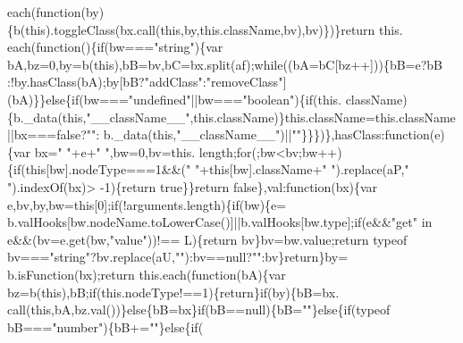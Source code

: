 \begin{DoxyCode}
      each(\textcolor{keyword}{function}(by)\{b(\textcolor{keyword}{this}).toggleClass(bx.call(\textcolor{keyword}{this},by,\textcolor{keyword}{this}.className,bv),bv)\})\}\textcolor{keywordflow}{return} this.
      each(\textcolor{keyword}{function}()\{\textcolor{keywordflow}{if}(bw===\textcolor{stringliteral}{"string"})\{var bA,bz=0,by=b(\textcolor{keyword}{this}),bB=bv,bC=bx.split(af);\textcolor{keywordflow}{while}((bA=bC[bz++]))\{bB=e?bB
      :!by.hasClass(bA);by[bB?\textcolor{stringliteral}{"addClass"}:\textcolor{stringliteral}{"removeClass"}](bA)\}\}\textcolor{keywordflow}{else}\{\textcolor{keywordflow}{if}(bw===\textcolor{stringliteral}{"undefined"}||bw===\textcolor{stringliteral}{"boolean"})\{\textcolor{keywordflow}{if}(this.
      className)\{b.\_data(\textcolor{keyword}{this},\textcolor{stringliteral}{"\_\_className\_\_"},this.className)\}this.className=this.className||bx===\textcolor{keyword}{false}?\textcolor{stringliteral}{""}:
      b.\_data(\textcolor{keyword}{this},\textcolor{stringliteral}{"\_\_className\_\_"})||\textcolor{stringliteral}{""}\}\}\})\},hasClass:\textcolor{keyword}{function}(e)\{var bx=\textcolor{stringliteral}{" "}+e+\textcolor{stringliteral}{" "},bw=0,bv=this.
      length;\textcolor{keywordflow}{for}(;bw<bv;bw++)\{\textcolor{keywordflow}{if}(\textcolor{keyword}{this}[bw].nodeType===1&&(\textcolor{stringliteral}{" "}+\textcolor{keyword}{this}[bw].className+\textcolor{stringliteral}{" "}).replace(aP,\textcolor{stringliteral}{" "}).indexOf(bx)>
      -1)\{\textcolor{keywordflow}{return} \textcolor{keyword}{true}\}\}\textcolor{keywordflow}{return} \textcolor{keyword}{false}\},val:\textcolor{keyword}{function}(bx)\{var e,bv,by,bw=\textcolor{keyword}{this}[0];\textcolor{keywordflow}{if}(!arguments.length)\{\textcolor{keywordflow}{if}(bw)\{e=
      b.valHooks[bw.nodeName.toLowerCase()]||b.valHooks[bw.type];\textcolor{keywordflow}{if}(e&&\textcolor{stringliteral}{"get"} in e&&(bv=e.get(bw,\textcolor{stringliteral}{"value"}))!==
      L)\{\textcolor{keywordflow}{return} bv\}bv=bw.value;\textcolor{keywordflow}{return} typeof bv===\textcolor{stringliteral}{"string"}?bv.replace(aU,\textcolor{stringliteral}{""}):bv==null?\textcolor{stringliteral}{""}:bv\}\textcolor{keywordflow}{return}\}by=
      b.isFunction(bx);\textcolor{keywordflow}{return} this.each(\textcolor{keyword}{function}(bA)\{var bz=b(\textcolor{keyword}{this}),bB;\textcolor{keywordflow}{if}(this.nodeType!==1)\{\textcolor{keywordflow}{return}\}\textcolor{keywordflow}{if}(by)\{bB=bx.
      call(\textcolor{keyword}{this},bA,bz.val())\}\textcolor{keywordflow}{else}\{bB=bx\}\textcolor{keywordflow}{if}(bB==null)\{bB=\textcolor{stringliteral}{""}\}\textcolor{keywordflow}{else}\{\textcolor{keywordflow}{if}(typeof bB===\textcolor{stringliteral}{"number"})\{bB+=\textcolor{stringliteral}{""}\}\textcolor{keywordflow}{else}\{\textcolor{keywordflow}{if}(

\end{DoxyCode}
